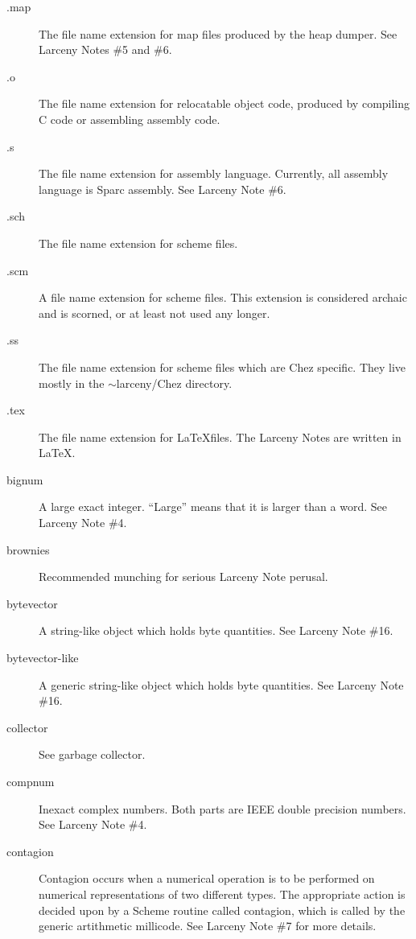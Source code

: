 \begin{description}
\item[.map]
The file name extension for map files produced by the heap dumper.
See Larceny Notes \#5 and \#6.

\item[.o]
The file name extension for relocatable object code, produced
by compiling C code or assembling assembly code.

\item[.s]
The file name extension for assembly language.  Currently, all assembly
language is Sparc assembly.
See Larceny Note \#6.

\item[.sch]
The file name extension for scheme files.

\item[.scm]
A file name extension for scheme files.  This extension is considered
archaic and is scorned, or at least not used any longer.

\item[.ss]
The file name extension for scheme files which are Chez specific.  
They live mostly in the $\sim$larceny/Chez directory.

\item[.tex]
The file name extension for \LaTeX files.  The Larceny Notes are written
in \LaTeX.

\item[bignum]
A large exact integer.  ``Large'' means that it is larger than a word.
See Larceny Note \#4.

\item[brownies]
Recommended munching for serious Larceny Note perusal.

\item[bytevector]
A string-like object which holds byte quantities.
See Larceny Note \#16.

\item[bytevector-like]
A generic string-like object which holds byte quantities.
See Larceny Note \#16.

\item[collector]
See garbage collector.

\item[compnum]
Inexact complex numbers.  Both parts are IEEE double precision numbers.
See Larceny Note \#4.

\item[contagion]
Contagion occurs when a numerical operation is to be performed on
numerical representations of two different types.  The appropriate
action is decided upon by a Scheme routine called contagion, which
is called by the generic artithmetic millicode.  See Larceny Note
\#7 for more details.


\end{description}

